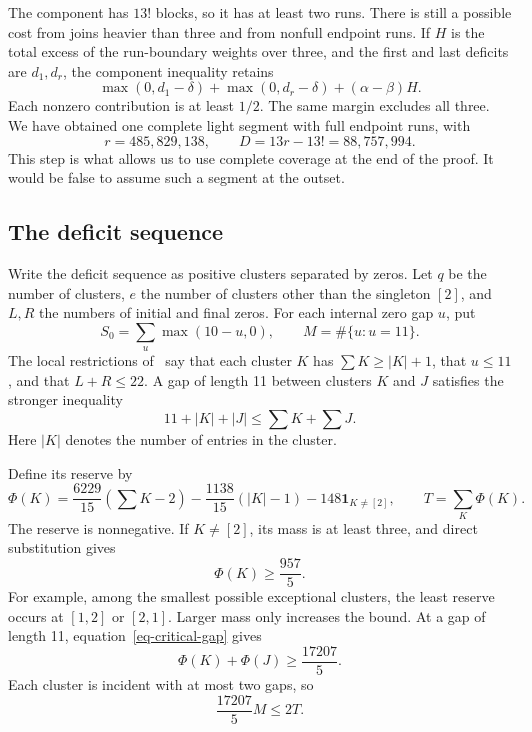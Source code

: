 \documentclass[11pt]{article}
\newcommand{\ind}{\mathbf 1}
\begin{document}
The component has $13!$ blocks, so it has at least two runs.
There is still a possible cost from joins heavier than three and from
nonfull endpoint runs. If $H$ is the total excess of the run-boundary
weights over three, and the first and last deficits are $d_1,d_r$, the
component inequality retains
\[
 \max(0,d_1-\delta)+\max(0,d_r-\delta)+(\alpha-\beta)H.
\]
Each nonzero contribution is at least $1/2$. The same margin excludes
all three. We have obtained one complete light segment with full
endpoint runs, with
\begin{equation}\label{eq-rD}
 r=485{,}829{,}138,\qquad
 D=13r-13!=88{,}757{,}994.
\end{equation}
This step is what allows us to use complete coverage at the end of the
proof. It would be false to assume such a segment at the outset.

\subsection{The deficit sequence}
Write the deficit sequence as positive clusters separated by zeros.
Let $q$ be the number of clusters, $e$ the number of clusters other
than the singleton $[2]$, and $L,R$ the numbers of initial and final
zeros. For each internal zero gap $u$, put
\[
 S_0=\sum_u\max(10-u,0),\qquad M=\#\{u:u=11\}.
\]
The local restrictions of~\cite{returns} say that each cluster $K$ has
$\sum K\ge |K|+1$, that $u\le11$, and that $L+R\le22$. A gap of
length 11 between clusters $K$ and $J$ satisfies the stronger inequality
\begin{equation}\label{eq-critical-gap}
 11+|K|+|J|\le\sum K+\sum J.
\end{equation}
Here $|K|$ denotes the number of entries in the cluster.

Define its reserve by
\[
 \Phi(K)=\frac{6229}{15}(\sum K-2)
       -\frac{1138}{15}(|K|-1)-148\ind_{K\ne[2]},
 \qquad T=\sum_K\Phi(K).
\]
The reserve is nonnegative. If $K\ne[2]$, its mass is at least three,
and direct substitution gives
\begin{equation}\label{eq-exceptional-reserve}
 \Phi(K)\ge\frac{957}{5}.
\end{equation}
For example, among the smallest possible exceptional clusters, the
least reserve occurs at $[1,2]$ or $[2,1]$. Larger mass only increases
the bound. At a gap of length 11, equation~\eqref{eq-critical-gap} gives
\[
 \Phi(K)+\Phi(J)\ge\frac{17207}{5}.
\]
Each cluster is incident with at most two gaps, so
\begin{equation}\label{eq-degree-two}
 \frac{17207}{5}M\le2T.
\end{equation}
\end{document}
